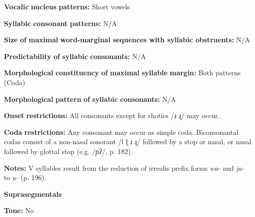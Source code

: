 \begin{styleBody}
\textbf{Vocalic} \textbf{nucleus} \textbf{patterns:} Short vowels
\end{styleBody}

\begin{styleBody}
\textbf{Syllabic} \textbf{consonant} \textbf{patterns:} N/A
\end{styleBody}

\begin{styleBody}
\textbf{Size} \textbf{of} \textbf{maximal} \textbf{word{}-marginal sequences with syllabic obstruents:} N/A
\end{styleBody}

\begin{styleBody}
\textbf{Predictability} \textbf{of} \textbf{syllabic} \textbf{consonants:} N/A
\end{styleBody}

\begin{styleBody}
\textbf{Morphological} \textbf{constituency} \textbf{of} \textbf{maximal} \textbf{syllable} \textbf{margin:} Both patterns (Coda)
\end{styleBody}

\begin{styleBody}
\textbf{Morphological} \textbf{pattern} \textbf{of} \textbf{syllabic} \textbf{consonants:} N/A
\end{styleBody}

\begin{styleBody}
\textbf{Onset} \textbf{restrictions:} All consonants except for rhotics /ɹ ɻ/ may occur.
\end{styleBody}

\begin{styleBody}
\textbf{Coda} \textbf{restrictions:} Any consonant may occur as simple coda. Biconsonantal codas consist of a non-nasal sonorant /l ɭ ɹ ɻ/ followed by a stop or nasal, or nasal followed by glottal stop (e.g. /ɲʔ/, p. 182).
\end{styleBody}

\begin{styleBody}
\textbf{Notes:} V syllables result from the reduction of irrealis prefix forms \textit{wa-} and \textit{ja-} to \textit{a-} (p. 196).
\end{styleBody}

\begin{styleBody}
\textbf{Suprasegmentals}
\end{styleBody}

\begin{styleBody}
\textbf{Tone:} No
\end{styleBody}

